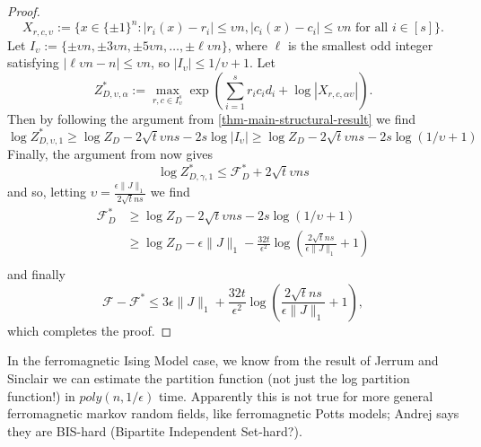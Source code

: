 \documentclass[final, 12pt]{colt2018}
\theoremstyle{definition}
\theoremstyle{plain}
\begin{document}
\begin{proof}
$$X_{r,c,\upsilon}:= \{x\in \{\pm1\}^{n}: |r_i(x)-r_i| \leq \upsilon n, |c_i(x)-c_i| \leq \upsilon n \text{ for all } i\in [s]\}.$$ 
Let $I_\upsilon := \{\pm\upsilon n, \pm 3\upsilon n,\pm 5\upsilon n,\dots,\pm\ell \upsilon n\}$, where $\ell$ is the smallest odd integer satisfying $|\ell \upsilon n - n| \leq \upsilon n$, so $|I_{\upsilon}| \le 1/\upsilon + 1$. Let 
$$Z_{D,\upsilon,\alpha}^{*}:=\max_{r,c\in I_{\upsilon}^{s}}\exp\left(\sum_{i=1}^{s}r_{i}c_{i}d_{i}+\log|X_{r,c,\alpha\upsilon}|\right).$$
Then by following the argument from \cref{thm-main-structural-result} we find
\begin{equation}
\label{eqn:ltr-approx-sum-by-max-lb}
\log Z_{D,\upsilon,1}^{*}\geq\log Z_{D}-2\sqrt{t}\upsilon ns - 2s\log |I_\upsilon| \ge \log Z_{D}-2\sqrt{t}\upsilon ns - 2s\log(1/\upsilon + 1)
\end{equation}
Finally, the argument from  now gives
\[ \log Z^*_{D,\gamma,1} \le \mathcal{F}^*_D + 2\sqrt{t}\upsilon ns \]
and so, letting $\upsilon = \frac{\epsilon \|J\|_1}{2 \sqrt{t} n s}$ we find
\begin{align*}
\mathcal{F}^*_D 
&\ge \log Z_D - 2\sqrt{t}\upsilon ns - 2s\log(1/\upsilon + 1) \\
&\ge \log Z_D - \epsilon \|J\|_1 - \frac{32t}{\epsilon^2} \log(\frac{2 \sqrt{t} n s}{\epsilon \|J\|_1} + 1) \\
\end{align*}
and finally
\[ \mathcal{F} - \mathcal{F}^* \le 3 \epsilon \|J\|_1 + \frac{32t}{\epsilon^2} \log\left(\frac{2 \sqrt{t} n s}{\epsilon \|J\|_1} + 1\right), \]
which completes the proof. 
\end{proof}



\iffalse %
In the ferromagnetic Ising Model case, we know from the result of
Jerrum and Sinclair we can estimate the partition function (not just
the log partition function!) in $poly(n,1/\epsilon)$ time. Apparently
this is not true for more general ferromagnetic markov random fields, like
ferromagnetic Potts models; Andrej says they are BIS-hard (Bipartite Independent
Set-hard?). 
\end{document}
